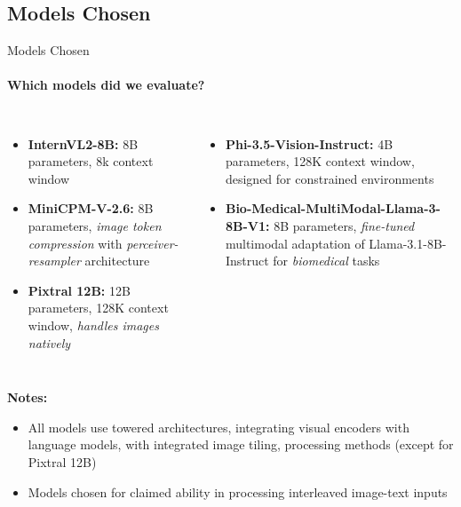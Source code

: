 \subsection{Models Chosen}
\begin{frame}{Models Chosen}
\framesubtitle{Which models did we evaluate?}
  \vspace{-1em}
  \begin{columns}[T]
    \column{\customcolumnwidth}
    \begin{itemize}
      \item \textbf{InternVL2-8B:} 8B parameters, 8k context window
      \item \textbf{MiniCPM-V-2.6:} 8B parameters, \emph{image token compression} with \emph{perceiver-resampler} architecture
      \item \textbf{Pixtral 12B:} 12B parameters, 128K context window, \emph{handles images natively}
    \end{itemize}
    \column{\customcolumnwidth}
    \begin{itemize}
      \item \textbf{Phi-3.5-Vision-Instruct:} 4B parameters, 128K context window, designed for constrained environments
      \item \textbf{Bio-Medical-MultiModal-Llama-3-8B-V1:} 8B parameters, \emph{fine-tuned} multimodal adaptation of Llama-3.1-8B-Instruct for \emph{biomedical} tasks
    \end{itemize}
  \end{columns}
  \textbf{Notes:}
  \begin{itemize}
    \setlength{\itemsep}{0em}
    \item All models use towered architectures, integrating visual encoders with language models, with integrated image tiling, processing methods (except for Pixtral 12B)
    \item Models chosen for claimed ability in processing interleaved image-text inputs
  \end{itemize}
\end{frame}


